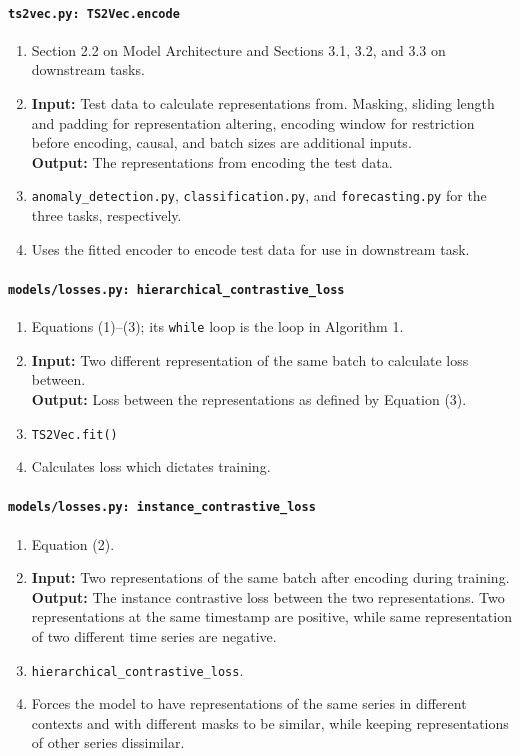 \documentclass[a4paper,11pt]{article}
\newcommand{\code}[1]{\texttt{#1}}
\begin{document}
\paragraph{\code{ts2vec.py: TS2Vec.encode}}
\begin{enumerate}[label=(\roman*)]
\item Section 2.2 on Model Architecture and Sections 3.1, 3.2, and 3.3 on downstream tasks.
\item 
    \textbf{Input:} Test data to calculate representations from. Masking, sliding length and padding for representation altering, encoding window for restriction before encoding, causal, and batch sizes are additional inputs. \\
    \textbf{Output:} The representations from encoding the test data.
\item \texttt{anomaly\_detection.py}, \texttt{classification.py}, and \texttt{forecasting.py} for the three tasks, respectively.
\item Uses the fitted encoder to encode test data for use in downstream task.
\end{enumerate}

\paragraph{\code{models/losses.py: hierarchical\_contrastive\_loss}}
\begin{enumerate}[label=(\roman*)]
\item Equations (1)--(3); its \texttt{while} loop is the loop in Algorithm 1.
\item 
    \textbf{Input:} Two different representation of the same batch to calculate loss between. \\
    \textbf{Output:} Loss between the representations as defined by Equation (3).
\item \texttt{TS2Vec.fit()}
\item Calculates loss which dictates training.
\end{enumerate}

\paragraph{\code{models/losses.py: instance\_contrastive\_loss}}
\begin{enumerate}[label=(\roman*)]
\item Equation (2).
\item
    \textbf{Input:} Two representations of the same batch after encoding during training. \\
    \textbf{Output:} The instance contrastive loss between the two representations. Two representations at the same timestamp are positive, while same representation of two different time series are negative.
\item \texttt{hierarchical\_contrastive\_loss}.
\item Forces the model to have representations of the same series in different contexts and with different masks to be similar, while keeping representations of other series dissimilar.
\end{enumerate}
\end{document}
